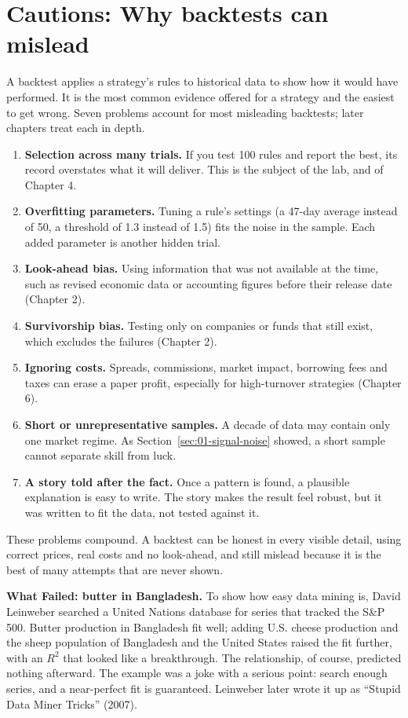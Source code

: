 \section{Cautions: Why backtests can mislead}
\label{sec:01-backtests}

A backtest applies a strategy's rules to historical data to show how it would have performed. It is the most common evidence offered for a strategy and the easiest to get wrong. Seven problems account for most misleading backtests; later chapters treat each in depth.

\begin{enumerate}
  \item \textbf{Selection across many trials.} If you test 100 rules and report the best, its record overstates what it will deliver. This is the subject of the lab, and of Chapter 4.
  \item \textbf{Overfitting parameters.} Tuning a rule's settings (a 47-day average instead of 50, a threshold of 1.3 instead of 1.5) fits the noise in the sample. Each added parameter is another hidden trial.
  \item \textbf{Look-ahead bias.} Using information that was not available at the time, such as revised economic data or accounting figures before their release date (Chapter 2).
  \item \textbf{Survivorship bias.} Testing only on companies or funds that still exist, which excludes the failures (Chapter 2).
  \item \textbf{Ignoring costs.} Spreads, commissions, market impact, borrowing fees and taxes can erase a paper profit, especially for high-turnover strategies (Chapter 6).
  \item \textbf{Short or unrepresentative samples.} A decade of data may contain only one market regime. As Section~\ref{sec:01-signal-noise} showed, a short sample cannot separate skill from luck.
  \item \textbf{A story told after the fact.} Once a pattern is found, a plausible explanation is easy to write. The story makes the result feel robust, but it was written to fit the data, not tested against it.
\end{enumerate}

These problems compound. A backtest can be honest in every visible detail, using correct prices, real costs and no look-ahead, and still mislead because it is the best of many attempts that are never shown.

\begin{callout}
\textbf{What Failed: butter in Bangladesh.} To show how easy data mining is, David Leinweber searched a United Nations database for series that tracked the S\&P 500. Butter production in Bangladesh fit well; adding U.S. cheese production and the sheep population of Bangladesh and the United States raised the fit further, with an $R^2$ that looked like a breakthrough. The relationship, of course, predicted nothing afterward. The example was a joke with a serious point: search enough series, and a near-perfect fit is guaranteed. Leinweber later wrote it up as ``Stupid Data Miner Tricks'' (2007).
\end{callout}

